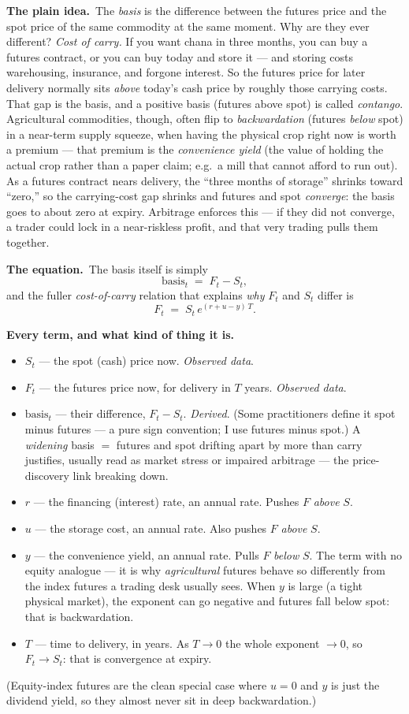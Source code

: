 \documentclass[11pt]{article}
\newcommand{\intuit}{\smallskip\noindent\textbf{The plain idea.}\ }
\newcommand{\formula}{\smallskip\noindent\textbf{The equation.}\ }
\newcommand{\vars}{\smallskip\noindent\textbf{Every term, and what kind of thing it is.}\ }
\begin{document}
\intuit The \emph{basis} is the difference between the futures price and the spot price of the same
commodity at the same moment. Why are they ever different? \emph{Cost of carry.} If you want chana
in three months, you can buy a futures contract, or you can buy today and store it --- and storing
costs warehousing, insurance, and forgone interest. So the futures price for later delivery normally
sits \emph{above} today's cash price by roughly those carrying costs. That gap is the basis, and a
positive basis (futures above spot) is called \emph{contango}. Agricultural commodities, though,
often flip to \emph{backwardation} (futures \emph{below} spot) in a near-term supply squeeze, when
having the physical crop right now is worth a premium --- that premium is the \emph{convenience
yield} (the value of holding the actual crop rather than a paper claim; e.g.\ a mill that cannot
afford to run out). As a futures contract nears delivery, the ``three months of storage'' shrinks
toward ``zero,'' so the carrying-cost gap shrinks and futures and spot \emph{converge}: the basis
goes to about zero at expiry. Arbitrage enforces this --- if they did not converge, a trader could
lock in a near-riskless profit, and that very trading pulls them together.

\formula The basis itself is simply
\[
\text{basis}_t \;=\; F_t - S_t,
\]
and the fuller \emph{cost-of-carry} relation that explains \emph{why} $F_t$ and $S_t$ differ is
\[
F_t \;=\; S_t \, e^{(r + u - y)\,T}.
\]

\vars
\begin{itemize}
\item $S_t$ --- the spot (cash) price now. \emph{Observed data}.
\item $F_t$ --- the futures price now, for delivery in $T$ years. \emph{Observed data}.
\item $\text{basis}_t$ --- their difference, $F_t - S_t$. \emph{Derived}. (Some practitioners define
it spot minus futures --- a pure sign convention; I use futures minus spot.) A \emph{widening} basis
$=$ futures and spot drifting apart by more than carry justifies, usually read as market stress or
impaired arbitrage --- the price-discovery link breaking down.
\item $r$ --- the financing (interest) rate, an annual rate. Pushes $F$ \emph{above} $S$.
\item $u$ --- the storage cost, an annual rate. Also pushes $F$ \emph{above} $S$.
\item $y$ --- the convenience yield, an annual rate. Pulls $F$ \emph{below} $S$. The term with no
equity analogue --- it is why \emph{agricultural} futures behave so differently from the index
futures a trading desk usually sees. When $y$ is large (a tight physical market), the exponent can go
negative and futures fall below spot: that is backwardation.
\item $T$ --- time to delivery, in years. As $T \to 0$ the whole exponent $\to 0$, so $F_t \to S_t$:
that is convergence at expiry.
\end{itemize}
(Equity-index futures are the clean special case where $u=0$ and $y$ is just the dividend yield, so
they almost never sit in deep backwardation.)
\end{document}
